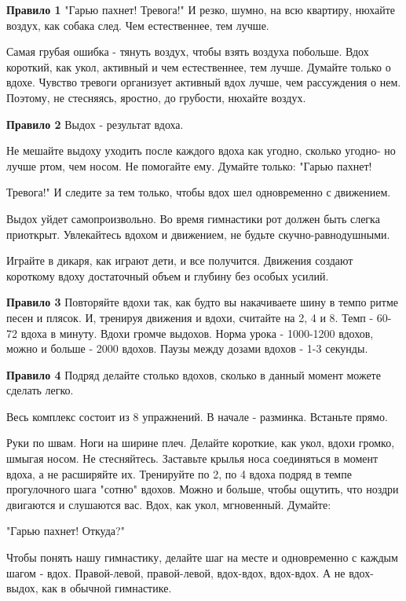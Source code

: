 \documentclass[a4paper]{article}
\begin{document}
    \textbf{Правило 1}
    "Гарью пахнет! Тревога!" И резко, шумно, на всю квартиру, нюхайте воздух, как собака след. Чем естественнее, тем лучше.

    Самая грубая ошибка - тянуть воздух, чтобы взять воздуха побольше. Вдох короткий, как укол, активный и чем естественнее, тем лучше. Думайте только о вдохе. Чувство тревоги организует активный вдох лучше, чем рассуждения о нем. Поэтому, не стесняясь, яростно, до грубости, нюхайте воздух.

    \textbf{Правило 2}
    Выдох - результат вдоха.

    Не мешайте выдоху уходить после каждого вдоха как угодно, сколько угодно- но лучше ртом, чем носом. Не помогайте ему. Думайте только: "Гарью пахнет!

    Тревога!" И следите за тем только, чтобы вдох шел одновременно с движением.

    Выдох уйдет самопроизвольно. Во время гимнастики рот должен быть слегка приоткрыт. Увлекайтесь вдохом и движением, не будьте скучно-равнодушными.

    Играйте в дикаря, как играют дети, и все получится. Движения создают короткому вдоху достаточный объем и глубину без особых усилий.

    \textbf{Правило 3}
    Повторяйте вдохи так, как будто вы накачиваете шину в темпо ритме песен и плясок. И, тренируя движения и вдохи, считайте на 2, 4 и 8. Темп - 60-72 вдоха в минуту. Вдохи громче выдохов. Норма урока - 1000-1200 вдохов, можно и больше - 2000 вдохов. Паузы между дозами вдохов - 1-3 секунды.

    \textbf{Правило 4}
    Подряд делайте столько вдохов, сколько в данный момент можете сделать легко.

    Весь комплекс состоит из 8 упражнений. В начале - разминка. Встаньте прямо.

    Руки по швам. Ноги на ширине плеч. Делайте короткие, как укол, вдохи громко, шмыгая носом. Не стесняйтесь. Заставьте крылья носа соединяться в момент вдоха, а не расширяйте их. Тренируйте по 2, по 4 вдоха подряд в темпе прогулочного шага "сотню" вдохов. Можно и больше, чтобы ощутить, что ноздри двигаются и слушаются вас. Вдох, как укол, мгновенный. Думайте:

    "Гарью пахнет! Откуда?"

    Чтобы понять нашу гимнастику, делайте шаг на месте и одновременно с каждым шагом - вдох. Правой-левой, правой-левой, вдох-вдох, вдох-вдох. А не вдох-выдох, как в обычной гимнастике.
\end{document}
